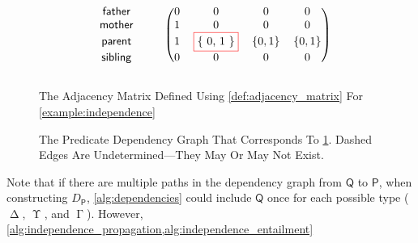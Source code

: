\documentclass[letterpaper]{article}
\theoremstyle{definition}
\renewcommand\fbox{\fcolorbox{red}{white}}
\DeclareMathOperator{\Determined}{\Delta}
\DeclareMathOperator{\Undetermined}{\Upsilon}
\DeclareMathOperator{\AlmostDetermined}{\Gamma}
\begin{document}
\begin{figure}
  \centering
  \[
    \begin{blockarray}{ccccccc}
      \begin{block}{ccc(cccc)}
        \mathsf{father} & & & 0 & 0 & 0 & 0 \\
        \mathsf{mother} & & & 1 & 0 & 0 & 0 \\
        \mathsf{parent} & & & 1 & \fbox{\{ 0, 1 \}} & \{ 0, 1 \} & \{ 0, 1 \} \\
        \mathsf{sibling} & & & 0 & 0 & 0 & 0 \\
      \end{block}
    \end{blockarray}
  \]
  \caption{The Adjacency Matrix Defined Using \cref{def:adjacency_matrix} For
    \cref{example:independence}}
  \label{fig:dependencies_matrix}
\end{figure}
\begin{figure}[t]
  \centering
  \caption{The Predicate Dependency Graph That Corresponds To
    \cref{fig:dependencies_matrix}. Dashed Edges Are Undetermined---They May
    Or May Not Exist.}
  \label{fig:dependencies2}
\end{figure}


Note that if there are multiple paths in the dependency graph from $\mathsf{Q}$
to $\mathsf{P}$, when constructing $D_{\mathsf{P}}$, \cref{alg:dependencies}
could include $\mathsf{Q}$ once for each possible type ($\Determined$,
$\Undetermined$, and $\AlmostDetermined$). However,
\cref{alg:independence_propagation,alg:independence_entailment}
\end{document}
